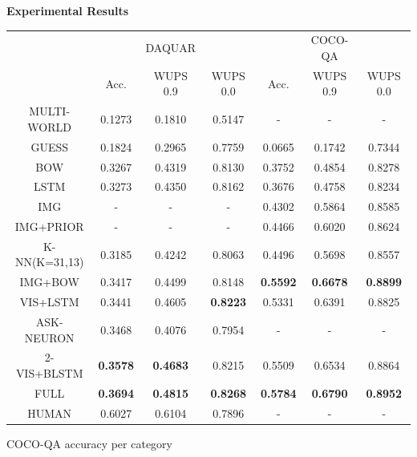 \documentclass{beamer}
\renewcommand{\*}[1]{\textbf{#1}}
\begin{document}
\begin{frame}{}
\begin{columns}[T]
\begin{column}{0.32\linewidth}
\begin{block}{\bf{\large Experimental Results}}
\begin{table}[t!]
\begin{center}
\begin{tabular}{c | c c c | c c c}
\hline
            &          &  DAQUAR  &          &          &  COCO-QA &          \\
            &  Acc.    & WUPS 0.9 & WUPS 0.0 &  Acc.    & WUPS 0.9 & WUPS 0.0 \\
\hline         
MULTI-WORLD 
\cite{mal1} &  0.1273  &  0.1810  &  0.5147  &  -       &  -       &  -       \\
GUESS       &  0.1824  &  0.2965  &  0.7759  &  0.0665  &  0.1742  &  0.7344  \\
BOW         &  0.3267  &  0.4319  &  0.8130  &  0.3752  &  0.4854  &  0.8278  \\
LSTM        &  0.3273  &  0.4350  &  0.8162  &  0.3676  &  0.4758  &  0.8234  \\
IMG         &  -       &  -       &  -       &  0.4302  &  0.5864  &  0.8585  \\
IMG+PRIOR   &  -       &  -       &  -       &  0.4466  &  0.6020  &  0.8624  \\
K-NN(K=31,13)& 0.3185  &  0.4242  &  0.8063  &  0.4496  &  0.5698  &  0.8557  \\
IMG+BOW     &  0.3417  &  0.4499  &  0.8148  &\*{0.5592}&\*{0.6678}&\*{0.8899}\\
VIS+LSTM    &  0.3441  &  0.4605  &\*{0.8223}&  0.5331  &  0.6391  & 0.8825   \\
ASK-NEURON 
\cite{mal2} &  0.3468  &  0.4076  & 0.7954   &  -       &  -       &  -       \\
2-VIS+BLSTM &\*{0.3578}&\*{0.4683}& 0.8215   &  0.5509  &  0.6534  & 0.8864   \\
FULL        &\*{0.3694}&\*{0.4815}&\*{0.8268}&\*{0.5784}&\*{0.6790}&\*{0.8952}\\
\hline
HUMAN       &  0.6027  &  0.6104  &  0.7896  &  -       &  -       &  -       \\
\hline
\end{tabular}

\end{center}
\end{table}
\vskip 0.4in
\vfill

\begin{table}[t!]
\caption{COCO-QA accuracy per category}
\small
\label{tab:cocoqa_acc_breakdown}
\begin{center}


\end{center}
\end{table}
\end{block}
\end{column}
\end{columns}
\end{frame}
\end{document}
